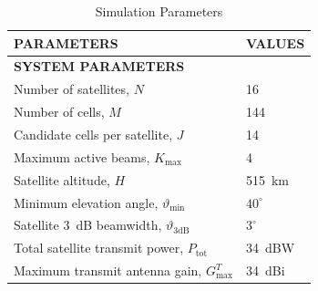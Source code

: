 \documentclass[journal]{IEEEtran}
\begin{document}
\begin{table}[t]
\centering
\caption{Simulation Parameters}
\label{tab:sim_params}
\renewcommand{\arraystretch}{1.08}
\begin{tabular}{l|l}
\hline
\textbf{PARAMETERS} & \textbf{VALUES} \\
\hline
\multicolumn{2}{l}{\textbf{SYSTEM PARAMETERS}} \\
Number of satellites, $N$ & 16 \\
Number of cells, $M$ & 144 \\
Candidate cells per satellite, $J$ & 14 \\
Maximum active beams, $K_{\max}$ & 4 \\
Satellite altitude, $H$ & 515~km \\
Minimum elevation angle, $\vartheta_{\min}$ & $40^\circ$\\
Satellite 3~dB beamwidth, $\vartheta_{3\mathrm{dB}}$ & $3^\circ$ \\
Total satellite transmit power, $P_{\mathrm{tot}}$ & 34~dBW \\
Maximum transmit antenna gain, $G_{\max}^T$ & 34~dBi \\


\end{tabular}
\end{table}
\end{document}
